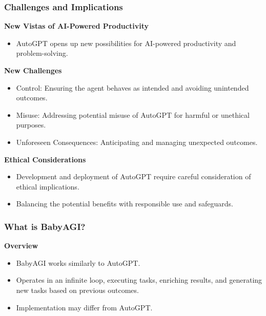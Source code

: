 \begin{frame}[fragile]
\frametitle{Challenges and Implications}

\textbf{New Vistas of AI-Powered Productivity}
\begin{itemize}
    \item AutoGPT opens up new possibilities for AI-powered productivity and problem-solving.
\end{itemize}

\textbf{New Challenges}
\begin{itemize}
    \item Control: Ensuring the agent behaves as intended and avoiding unintended outcomes.
    \item Misuse: Addressing potential misuse of AutoGPT for harmful or unethical purposes.
    \item Unforeseen Consequences: Anticipating and managing unexpected outcomes.
\end{itemize}

\textbf{Ethical Considerations}
\begin{itemize}
    \item Development and deployment of AutoGPT require careful consideration of ethical implications.
    \item Balancing the potential benefits with responsible use and safeguards.
\end{itemize}

\end{frame}

\begin{frame}[fragile]
\frametitle{What is BabyAGI?}

\textbf{Overview}
\begin{itemize}
    \item BabyAGI works similarly to AutoGPT.
    \item Operates in an infinite loop, executing tasks, enriching results, and generating new tasks based on previous outcomes.
    \item Implementation may differ from AutoGPT.
\end{itemize}

\end{frame}


